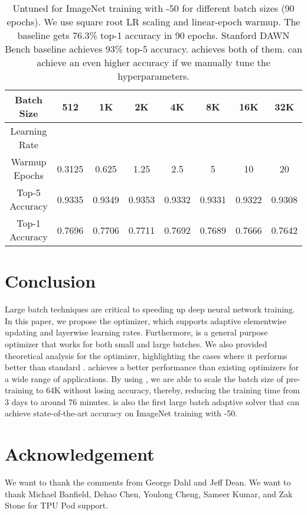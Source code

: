 \documentclass{article} \usepackage{iclr2020_conference,times}
\begin{document}
\begin{table}[ht]
\renewcommand{\arraystretch}{1.3}
\caption{Untuned  for ImageNet training with -50 for different batch sizes (90 epochs). We use square root LR scaling and linear-epoch warmup. The baseline \cite{goyal2017accurate} gets 76.3\% top-1 accuracy in 90 epochs. Stanford DAWN Bench \citep{coleman2017dawnbench} baseline achieves 93\% top-5 accuracy.  achieves both of them.  can achieve an even higher accuracy if we manually tune the hyperparameters.}
\centering
\begin{tabular}{|c|c|c|c|c|c|c|c|}
\hline
Batch Size & 512 & 1K & 2K & 4K & 8K & 16K & 32K\\
\hline
\hline
Learning Rate &  &  &  &  &  &  & \\
\hline
Warmup Epochs & 0.3125 & 0.625 & 1.25 & 2.5 & 5 & 10 & 20\\
\hline
Top-5 Accuracy & 0.9335 & 0.9349 & 0.9353 & 0.9332 & 0.9331 & 0.9322 & 0.9308 \\
\hline
Top-1 Accuracy & 0.7696 & 0.7706 & 0.7711 & 0.7692 & 0.7689 & 0.7666 & 0.7642 \\
\hline
\end{tabular}
\label{table:resnet_hyper_parameters}
\end{table} 
\section{Conclusion}
Large batch techniques are critical to speeding up deep neural network training. In this paper, we propose the  optimizer, which supports adaptive elementwise updating and layerwise learning rates. Furthermore,  is a general purpose optimizer that works for both small and large batches. We also provided theoretical analysis for the  optimizer, highlighting the cases where it performs better than standard .  achieves a better performance than existing optimizers for a wide range of applications.  By using , we are able to scale the batch size of  pre-training to 64K without losing accuracy, thereby, reducing the  training time from 3 days to around 76 minutes.  is also the first large batch adaptive solver that can achieve state-of-the-art accuracy on ImageNet training with -50. 
\vspace{-2mm}
\section{Acknowledgement}
\vspace*{-3mm}
We want to thank the comments from George Dahl and Jeff Dean.
We want to thank Michael Banfield, Dehao Chen, Youlong Cheng, Sameer Kumar, and Zak Stone for TPU Pod support.
%
 
\end{document}
